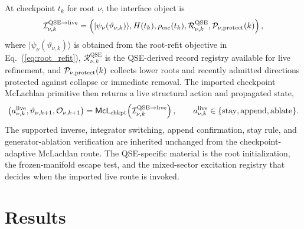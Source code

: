 \documentclass[
  reprint,
  amsmath,
  amssymb,
  aps,
  pra,
  nofootinbib,
  superscriptaddress,
  floatfix
]{revtex4-2}
\newcommand{\Oset}{\mathcal{O}}
\newcommand{\Rset}{\mathcal{R}}
\newcommand{\Pcal}{\mathcal{P}}
\newcommand{\stay}{\mathrm{stay}}
\newcommand{\app}{\mathrm{append}}
\newcommand{\ablate}{\mathrm{ablate}}
\newcommand{\qse}{\mathrm{QSE}}
\newcommand{\ket}[1]{|#1\rangle}
\begin{document}
At checkpoint $t_k$ for root $\nu$, the interface object is
\begin{equation}
\mathcal I_{\nu,k}^{\qse\to\mathrm{live}}
=
\left(
\ket{\psi_\nu(\vartheta_{\nu,k})},
H(t_k),
\rho_{\rm esc}(t_k),
\Rset_{\nu,k}^{\qse},
\Pcal_{\nu,\rm protect}(k)
\right),
\label{eq:qse_live_interface}
\end{equation}
where $\ket{\psi_\nu(\vartheta_{\nu,k})}$ is obtained from the root-refit objective in Eq.~(\ref{eq:root_refit}), $\Rset_{\nu,k}^{\qse}$ is the QSE-derived record registry available for live refinement, and $\Pcal_{\nu,\rm protect}(k)$ collects lower roots and recently admitted directions protected against collapse or immediate removal.  The imported checkpoint McLachlan primitive then returns a live structural action and propagated state,
\begin{equation}
\left(a_{\nu,k}^{\rm live},\vartheta_{\nu,k+1},\Oset_{\nu,k+1}\right)
=
\mathsf{McL}_{\rm chkpt}\!\left(\mathcal I_{\nu,k}^{\qse\to\mathrm{live}}\right),
\qquad
 a_{\nu,k}^{\rm live}\in\{\stay,\app,\ablate\}.
\label{eq:qse_live_checkpoint_primitive}
\end{equation}
The supported inverse, integrator switching, append confirmation, stay rule, and generator-ablation verification are inherited unchanged from the checkpoint-adaptive McLachlan route.  The QSE-specific material is the root initialization, the frozen-manifold escape test, and the mixed-sector excitation registry that decides when the imported live route is invoked.

\section{Results}
\label{sec:results}
\end{document}
